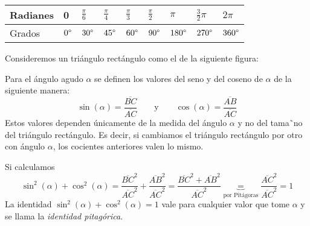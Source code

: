\documentclass[../Teoría.root.tex]{subfiles}
\begin{document}
\begin{center}
    \begin{tabularx}{\textwidth}{|m{2cm}|X|X|X|X|X|X|X|X|}
        \hline
        Radianes & 0            & \(\frac{\pi}{6}\) & \(\frac{\pi}{4}\) & \(\frac{\pi}{3}\) & \(\frac{\pi}{2}\) & \(\pi\)        & \(\frac{3}{2}\pi\) & \(2\pi\)       \\\hline
        Grados   & \(0\degree\) & \(30\degree\)     & \(45\degree\)     & \(60\degree\)     & \(90\degree\)     & \(180\degree\) & \(270\degree\)     & \(360\degree\) \\\hline
    \end{tabularx}
\end{center}
Consideremos un triángulo rectángulo como el de la siguiente figura:
\begin{center}
\end{center}
Para el ángulo agudo \(\alpha\) se definen los valores del seno y del coseno de \(\alpha\) de la siguiente manera:
\[\sin(\alpha)=\frac{\overline{BC}}{\overline{AC}}\qquad\text{y}\qquad\cos(\alpha)=\frac{\overline{AB}}{\overline{AC}}\]
Estos valores dependen únicamente de la medida del ángulo \(\alpha\) y no del tama˜no del triángulo rectángulo.
Es decir, si cambiamos el triángulo rectángulo por otro con ángulo \(\alpha\), los cocientes anteriores valen lo mismo.

Si calculamos \[\sin^2(\alpha)+\cos^2(\alpha)=\frac{\overline{BC}^2}{\overline{AC}^2}+\frac{\overline{AB}^2}{\overline{AC}^2}=\frac{\overline{BC}^2+\overline{AB}^2}{\overline{AC}^2}\underbrace{=}_{\text{por Pitágoras}}\frac{\overline{AC}^2}{\overline{AC}^2}=1\]
La identidad \(\sin^2(\alpha) + \cos^2(\alpha) = 1\) vale para cualquier valor que tome \(\alpha\) y se llama la \textit{identidad pitagórica}.
\end{document}
